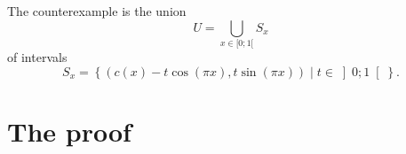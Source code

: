 \documentclass[oneside,draft]{amsart}
\newcommand{\setcond}[2]{\left\{#1\mid#2\right\}}
\newtheorem{prop}{Proposition}
\newtheorem{cor}{Corollary}
\begin{document}
The counterexample is the union
\begin{equation}\label{maindef}
U=\bigcup_{x\in[0;1[}S_x
\end{equation}
of intervals \[ S_x = \setcond{(c(x)-t\cos(\pi x), t\sin(\pi x))}{t\in\left]0;1\right[}. \]

\section{The proof}




            


\end{document}
